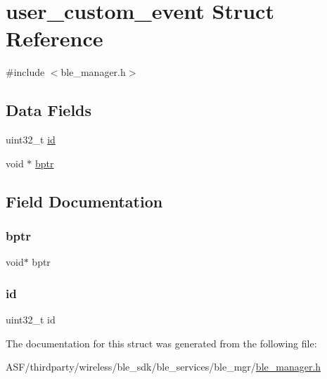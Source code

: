 \hypertarget{structuser__custom__event}{}\section{user\+\_\+custom\+\_\+event Struct Reference}
\label{structuser__custom__event}


{\ttfamily \#include $<$ble\+\_\+manager.\+h$>$}

\subsection*{Data Fields}
\begin{DoxyCompactItemize}
\item 
uint32\+\_\+t \mbox{\hyperlink{structuser__custom__event_abaabdc509cdaba7df9f56c6c76f3ae19}{id}}
\item 
void $\ast$ \mbox{\hyperlink{structuser__custom__event_a9ed88d29513c878d1826b37b7f9382cd}{bptr}}
\end{DoxyCompactItemize}


\subsection{Field Documentation}
\mbox{\label{structuser__custom__event_a9ed88d29513c878d1826b37b7f9382cd}} 
\subsubsection{\texorpdfstring{bptr}{bptr}}
{\footnotesize\ttfamily void$\ast$ bptr}

\mbox{\label{structuser__custom__event_abaabdc509cdaba7df9f56c6c76f3ae19}} 
\subsubsection{\texorpdfstring{id}{id}}
{\footnotesize\ttfamily uint32\+\_\+t id}



The documentation for this struct was generated from the following file\+:\begin{DoxyCompactItemize}
\item 
A\+S\+F/thirdparty/wireless/ble\+\_\+sdk/ble\+\_\+services/ble\+\_\+mgr/\mbox{\hyperlink{ble__manager_8h}{ble\+\_\+manager.\+h}}\end{DoxyCompactItemize}
